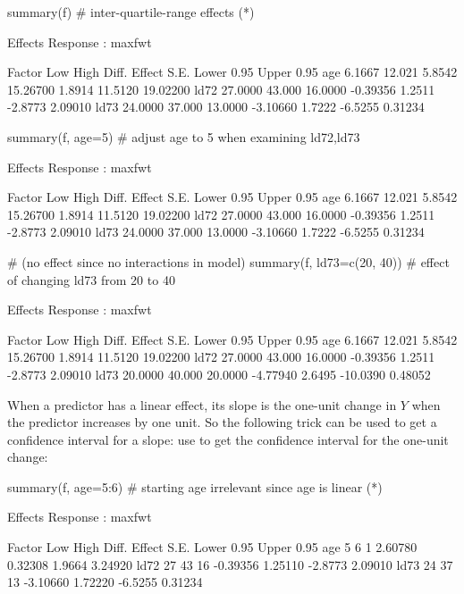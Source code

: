 \begin{Schunk}
\begin{Sinput}
summary(f)         # inter-quartile-range effects (*\ipacue*)
\end{Sinput}
\begin{Soutput}
             Effects              Response : maxfwt 

 Factor Low     High   Diff.   Effect   S.E.   Lower 0.95 Upper 0.95
 age     6.1667 12.021  5.8542 15.26700 1.8914 11.5120    19.02200  
 ld72   27.0000 43.000 16.0000 -0.39356 1.2511 -2.8773     2.09010  
 ld73   24.0000 37.000 13.0000 -3.10660 1.7222 -6.5255     0.31234  
\end{Soutput}
\begin{Sinput}
summary(f, age=5)  # adjust age to 5 when examining ld72,ld73
\end{Sinput}
\begin{Soutput}
             Effects              Response : maxfwt 

 Factor Low     High   Diff.   Effect   S.E.   Lower 0.95 Upper 0.95
 age     6.1667 12.021  5.8542 15.26700 1.8914 11.5120    19.02200  
 ld72   27.0000 43.000 16.0000 -0.39356 1.2511 -2.8773     2.09010  
 ld73   24.0000 37.000 13.0000 -3.10660 1.7222 -6.5255     0.31234  
\end{Soutput}
\begin{Sinput}
                   # (no effect since no interactions in model)
summary(f, ld73=c(20, 40))  # effect of changing ld73 from 20 to 40
\end{Sinput}
\begin{Soutput}
             Effects              Response : maxfwt 

 Factor Low     High   Diff.   Effect   S.E.   Lower 0.95 Upper 0.95
 age     6.1667 12.021  5.8542 15.26700 1.8914  11.5120   19.02200  
 ld72   27.0000 43.000 16.0000 -0.39356 1.2511  -2.8773    2.09010  
 ld73   20.0000 40.000 20.0000 -4.77940 2.6495 -10.0390    0.48052  
\end{Soutput}
\end{Schunk}

When a predictor has a linear effect, its slope is the one-unit change
in $Y$ when the predictor increases by one unit.  So the following
trick can be used to get a confidence interval for a slope: use
 to get the confidence interval for the one-unit change:

\begin{Schunk}
\begin{Sinput}
summary(f, age=5:6)    # starting age irrelevant since age is linear (*\ipacue*)
\end{Sinput}
\begin{Soutput}
             Effects              Response : maxfwt 

 Factor Low High Diff. Effect   S.E.    Lower 0.95 Upper 0.95
 age     5   6    1     2.60780 0.32308  1.9664    3.24920   
 ld72   27  43   16    -0.39356 1.25110 -2.8773    2.09010   
 ld73   24  37   13    -3.10660 1.72220 -6.5255    0.31234   
\end{Soutput}
\end{Schunk}

